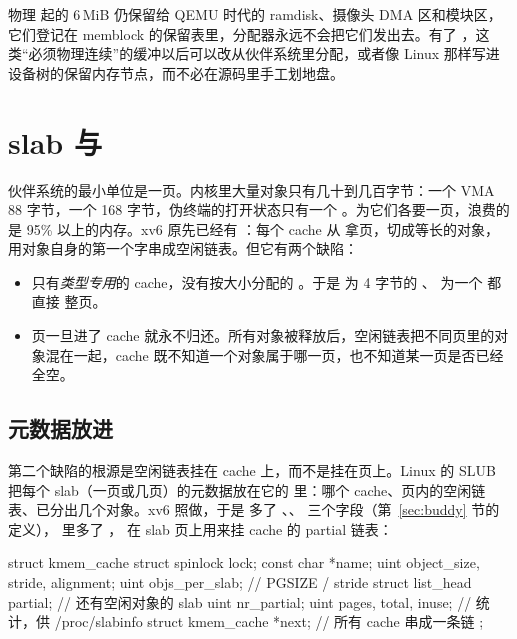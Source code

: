 物理  起的 6\,MiB 仍保留给 QEMU 时代的 ramdisk、摄像头 DMA 区和模块区，它们登记在 memblock 的保留表里，分配器永远不会把它们发出去。有了 ，这类“必须物理连续”的缓冲以后可以改从伙伴系统里分配，或者像 Linux 那样写进设备树的保留内存节点，而不必在源码里手工划地盘。

\section{slab 与 }
\label{sec:slab}

伙伴系统的最小单位是一页。内核里大量对象只有几十到几百字节：一个 VMA 88 字节，一个  168 字节，伪终端的打开状态只有一个 。为它们各要一页，浪费的是 95\% 以上的内存。xv6 原先已经有 ：每个 cache 从  拿页，切成等长的对象，用对象自身的第一个字串成空闲链表。但它有两个缺陷：

\begin{itemize}
  \item 只有\emph{类型专用}的 cache，没有按大小分配的 。于是  为 4 字节的 、 为一个  都直接  整页。
  \item 页一旦进了 cache 就永不归还。所有对象被释放后，空闲链表把不同页里的对象混在一起，cache 既不知道一个对象属于哪一页，也不知道某一页是否已经全空。
\end{itemize}

\subsection{元数据放进 }

第二个缺陷的根源是空闲链表挂在 cache 上，而不是挂在页上。Linux 的 SLUB 把每个 slab（一页或几页）的元数据放在它的  里：哪个 cache、页内的空闲链表、已分出几个对象。xv6 照做，于是  多了 、、 三个字段（第~\ref{sec:buddy} 节的定义）， 里多了 ， 在 slab 页上用来挂 cache 的 partial 链表：

\begin{ccode}
struct kmem_cache {
  struct spinlock lock;
  const char *name;
  uint object_size, stride, alignment;
  uint objs_per_slab;           // PGSIZE / stride
  struct list_head partial;     // 还有空闲对象的 slab
  uint nr_partial;
  uint pages, total, inuse;     // 统计，供 /proc/slabinfo
  struct kmem_cache *next;      // 所有 cache 串成一条链
};
\end{ccode}

